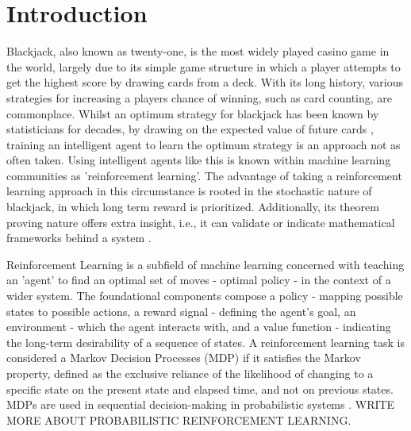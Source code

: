 \section{Introduction}

Blackjack, also known as twenty-one, is the most widely played casino game in the world, largely due to its simple game structure in which a player attempts to get the highest score by drawing cards from a deck. With its long history, various strategies for increasing a players chance of winning, such as card counting, are commonplace. Whilst an optimum strategy for blackjack has been known by statisticians for decades, by drawing on the expected value of future cards \cite{Baldwin01091956}, training an intelligent agent to learn the optimum strategy is an approach not as often taken. Using intelligent agents like this is known within machine learning communities as 'reinforcement learning'. The advantage of taking a reinforcement learning approach in this circumstance is rooted in the stochastic nature of blackjack, in which long term reward is prioritized. Additionally, its theorem proving nature offers extra insight, i.e., it can validate or indicate mathematical frameworks behind a system \cite{bidi2023reinforcementlearningcontroltheory}. 

\smallskip
Reinforcement Learning is a subfield of machine learning concerned with teaching an 'agent' to find an optimal set of moves - optimal policy - in the context of a wider system. The foundational components compose a policy - mapping possible states to possible actions, a reward signal - defining the agent's goal, an environment - which the agent interacts with, and a value function - indicating the long-term desirability of a sequence of states. A reinforcement learning task is considered a Markov Decision Processes (MDP) if it satisfies the Markov property, defined as the exclusive reliance of the likelihood of changing to a specific state on the present state and elapsed time, and not on previous states. MDPs are used in sequential decision-making in probabilistic systems \cite{10.5555/3312046}.     WRITE MORE ABOUT PROBABILISTIC REINFORCEMENT LEARNING. 


